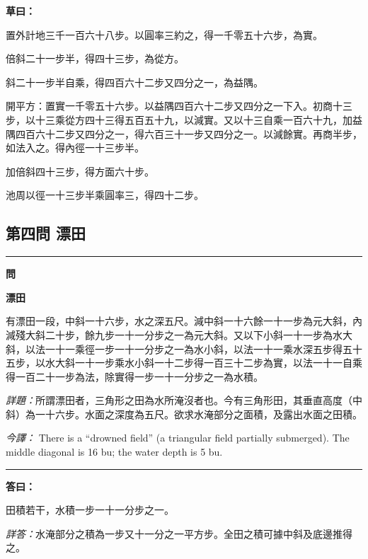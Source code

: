 \documentclass[11pt,a4paper]{article}
\newenvironment{problem}[1][]{%
  \medskip\noindent\rule{\textwidth}{0.4pt}%
  \par\noindent\textbf{\color{sectioncolor}#1}\par\nopagebreak%
  \smallskip%
}{%
  \par\noindent\rule{\textwidth}{0.4pt}\medskip%
}
\newenvironment{answer}{%
  \medskip\noindent{\color{answercolor}\rule{0.5\textwidth}{0.5pt}}%
  \par\color{answercolor}%
}{%
  \par\medskip%
}
\newenvironment{calculation}{%
  \medskip\noindent{\color{caocolor}\rule{0.4\textwidth}{0.4pt}}%
  \par\color{caocolor}%
}{%
  \par\medskip%
}
\begin{document}
\begin{calculation}
\textbf{草曰：}

置外計地三千一百六十八步。以圓率三約之，得一千零五十六步，為實。

倍斜二十一步半，得四十三步，為從方。

斜二十一步半自乘，得四百六十二步又四分之一，為益隅。

開平方：置實一千零五十六步。以益隅四百六十二步又四分之一下入。初商十三步，以十三乘從方四十三得五百五十九，以減實。又以十三自乘一百六十九，加益隅四百六十二步又四分之一，得六百三十一步又四分之一。以減餘實。再商半步，如法入之。得內徑一十三步半。

加倍斜四十三步，得方面六十步。

池周以徑一十三步半乘圓率三，得四十二步。
\end{calculation}

\subsection*{第四問 漂田}

\begin{problem}[\textbf{問}]
\textbf{\color{sectioncolor}漂田}

有漂田一段，中斜一十六步，水之深五尺。減中斜一十六餘一十一步為元大斜，內減殘大斜二十步，餘九步一十一分步之一為元大斜。又以下小斜一十一步為水大斜，以法一十一乘徑一步一十一分步之一為水小斜，以法一十一乘水深五步得五十五步，以水大斜一十一步乘水小斜一十二步得一百三十二步為實，以法一十一自乘得一百二十一步為法，除實得一步一十一分步之一為水積。

\medskip
\textit{詳題：}所謂漂田者，三角形之田為水所淹沒者也。今有三角形田，其垂直高度（中斜）為一十六步。水面之深度為五尺。欲求水淹部分之面積，及露出水面之田積。

\medskip
\textit{今譯：} There is a ``drowned field'' (a triangular field partially submerged). The middle diagonal is 16 bu; the water depth is 5 bu.
\end{problem}

\begin{answer}
\textbf{答曰：}

田積若干，水積一步一十一分步之一。

\medskip
\textit{詳答：}水淹部分之積為一步又十一分之一平方步。全田之積可據中斜及底邊推得之。
\end{answer}
\end{document}
